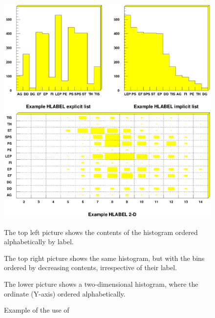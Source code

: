 %
%
%
\begin{figure}[p]
\includegraphics[width=\textwidth]{hlabel.eps}
\caption{Example of the use of \protect{}}
\label{fig:HLABEL}

\begin{UL}
\item The top left picture shows the contents of the histogram ordered
      alphabetically by label.
\item The top right picture shows the same histogram, but with the 
      bins ordered by decreasing contents, irrespective of their label.
\item The lower picture shows a two-dimensional histogram,
      where the ordinate (Y-axis) ordered alphabetically.
\end{UL}
\end{figure}


